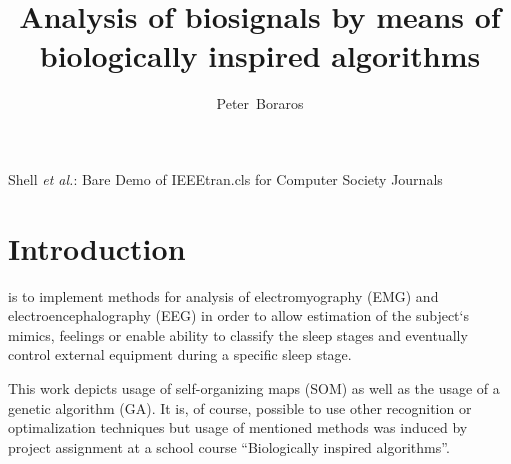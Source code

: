 \documentclass[a4paper,jurnal]{IEEEtran}
\begin{document}
\title[Analysis of biosignals]{Analysis of biosignals by means of\\ biologically inspired algorithms}

\author{Peter~Boraros%
}



%
{Shell \MakeLowercase{\textit{et al.}}: Bare Demo of IEEEtran.cls for Computer Society Journals}


\maketitle
\IEEEdisplaynotcompsoctitleabstractindextext
\IEEEpeerreviewmaketitle


\section{Introduction}
 is to implement methods for analysis of
electromyography (EMG) and electroencephalography (EEG)
in order to allow estimation of the subject`s mimics, 
feelings or enable ability to classify the sleep stages and eventually control 
external equipment during a specific sleep stage.

This work depicts usage of self-organizing maps (SOM) as well as the usage of a genetic
algorithm (GA). It is, of course, possible to use other recognition or optimalization
techniques but usage of mentioned 
methods was induced by project assignment at a school course ``Biologically inspired 
algorithms''.
\end{document}

